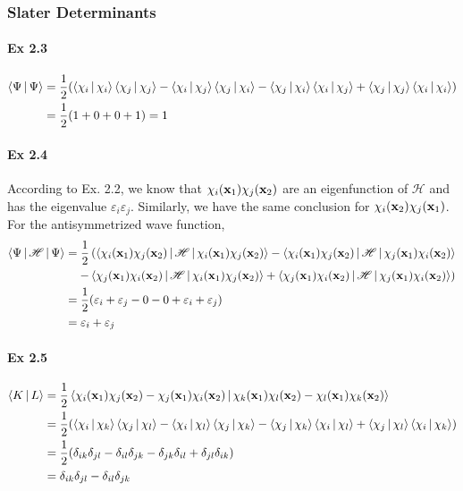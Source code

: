 \documentclass[a4paper]{article}
\newcommand{\ex}[1]{\paragraph{Ex #1}}
\numberwithin{equation}{subsection}
\begin{document}
\subsubsection{Slater Determinants}
\ex{2.3}
\begin{equation}\label{key}
\begin{aligned}
\Braket{\Psi | \Psi} 
&= \dfrac{1}{2}\qty(\Braket{\chi_i|\chi_i}\Braket{\chi_j|\chi_j} - \Braket{\chi_i|\chi_j}\Braket{\chi_j|\chi_i} - \Braket{\chi_j|\chi_i}\Braket{\chi_i|\chi_j} + \Braket{\chi_j|\chi_j}\Braket{\chi_i|\chi_i})\\
&= \dfrac{1}{2}(1+0+0+1) = 1
\end{aligned}
\end{equation}
\ex{2.4}
According to Ex. 2.2, we know that $ \chi_i(\vb{x}_1)\chi_j(\vb{x}_2) $ are an eigenfunction of $ \mathscr{H} $ and has the eigenvalue $ \varepsilon_i \varepsilon_j $. Similarly, we have the same conclusion for $ \chi_i(\vb{x}_2)\chi_j(\vb{x}_1) $.\\
For the antisymmetrized wave function,
\begin{equation}\label{key}
\begin{aligned}
\Braket{\Psi | \mathscr{H} | \Psi} &= \dfrac{1}{2}\left(\Braket{\chi_i(\vb{x}_1)\chi_j(\vb{x}_2) | \mathscr{H} | \chi_i(\vb{x}_1)\chi_j(\vb{x}_2)} - \Braket{\chi_i(\vb{x}_1)\chi_j(\vb{x}_2) | \mathscr{H} | \chi_j(\vb{x}_1)\chi_i(\vb{x}_2)}\right.\\
&\left. \quad - \Braket{\chi_j(\vb{x}_1)\chi_i(\vb{x}_2) | \mathscr{H} | \chi_i(\vb{x}_1)\chi_j(\vb{x}_2)} + \Braket{\chi_j(\vb{x}_1)\chi_i(\vb{x}_2) | \mathscr{H} | \chi_j(\vb{x}_1)\chi_i(\vb{x}_2)}\right)\\
&= \dfrac{1}{2}\qty(\varepsilon_i + \varepsilon_j - 0 - 0 + \varepsilon_i + \varepsilon_j)\\
&= \varepsilon_i + \varepsilon_j
\end{aligned}
\end{equation}

\ex{2.5}
\begin{equation}\label{key}
\begin{aligned}
\Braket{K | L} &= \dfrac{1}{2}\Braket{\chi_i(\vb{x}_1)\chi_j(\vb{x}_2) - \chi_j(\vb{x}_1)\chi_i(\vb{x}_2) | \chi_k(\vb{x}_1)\chi_l(\vb{x}_2) - \chi_l(\vb{x}_1)\chi_k(\vb{x}_2)}\\
&= \dfrac{1}{2}\qty(\Braket{\chi_i|\chi_k}\Braket{\chi_j|\chi_l} - \Braket{\chi_i|\chi_l}\Braket{\chi_j|\chi_k} - \Braket{\chi_j|\chi_k}\Braket{\chi_i|\chi_l} + \Braket{\chi_j|\chi_l}\Braket{\chi_i|\chi_k})\\
&= \dfrac{1}{2}\qty(\delta_{ik}\delta_{jl} - \delta_{il}\delta_{jk} - \delta_{jk}\delta_{il} + \delta_{jl}\delta_{ik})\\
&= \delta_{ik}\delta_{jl} - \delta_{il}\delta_{jk}
\end{aligned}
\end{equation}
\end{document}
